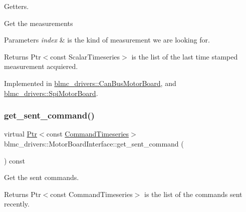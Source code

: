 Getters. 

Get the measurements


\begin{DoxyParams}{Parameters}
{\em index} & is the kind of measurement we are looking for. \\
\hline
\end{DoxyParams}
\begin{DoxyReturn}{Returns}
Ptr$<$const Scalar\+Timeseries$>$ is the list of the last time stamped measurement acquiered. 
\end{DoxyReturn}


Implemented in \hyperlink{classblmc__drivers_1_1CanBusMotorBoard_a0fac258ce65f51074bdb6c64ce8ebded}{blmc\+\_\+drivers\+::\+Can\+Bus\+Motor\+Board}, and \hyperlink{classblmc__drivers_1_1SpiMotorBoard_af3793742536e6d8dc5f5782c460553fd}{blmc\+\_\+drivers\+::\+Spi\+Motor\+Board}.

\mbox{\label{classblmc__drivers_1_1MotorBoardInterface_afd3de58f7a900347154b8d323f1c1d94}} 
\subsubsection{\texorpdfstring{get\+\_\+sent\+\_\+command()}{get\_sent\_command()}}
{\footnotesize\ttfamily virtual \hyperlink{classblmc__drivers_1_1MotorBoardInterface_a6a733b7ed7a3a96f6b0712b6bb5307f8}{Ptr}$<$const \hyperlink{classblmc__drivers_1_1MotorBoardInterface_ae2afe94a023d9f08a4c689e9b7660f15}{Command\+Timeseries}$>$ blmc\+\_\+drivers\+::\+Motor\+Board\+Interface\+::get\+\_\+sent\+\_\+command (\begin{DoxyParamCaption}{ }\end{DoxyParamCaption}) const\hspace{0.3cm}{\ttfamily [pure virtual]}}



Get the sent commands. 

\begin{DoxyReturn}{Returns}
Ptr$<$const Command\+Timeseries$>$ is the list of the commands sent recently. 
\end{DoxyReturn}


